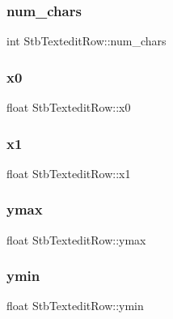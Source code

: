 \subsubsection{\texorpdfstring{num\+\_\+chars}{num\_chars}}
{\footnotesize\ttfamily int Stb\+Textedit\+Row\+::num\+\_\+chars}

\hypertarget{struct_stb_textedit_row_af30b3e1d61d1acea26d3e0ebec2cb81d}{}\label{struct_stb_textedit_row_af30b3e1d61d1acea26d3e0ebec2cb81d} 
\subsubsection{\texorpdfstring{x0}{x0}}
{\footnotesize\ttfamily float Stb\+Textedit\+Row\+::x0}

\hypertarget{struct_stb_textedit_row_a3a3e1a506030c871a1b3d09bf26e341f}{}\label{struct_stb_textedit_row_a3a3e1a506030c871a1b3d09bf26e341f} 
\subsubsection{\texorpdfstring{x1}{x1}}
{\footnotesize\ttfamily float Stb\+Textedit\+Row\+::x1}

\hypertarget{struct_stb_textedit_row_aab290e15f6a3b4a96ab2c2472cc8a7a5}{}\label{struct_stb_textedit_row_aab290e15f6a3b4a96ab2c2472cc8a7a5} 
\subsubsection{\texorpdfstring{ymax}{ymax}}
{\footnotesize\ttfamily float Stb\+Textedit\+Row\+::ymax}

\hypertarget{struct_stb_textedit_row_a707d331bd9dc99d64c81f71106b75eed}{}\label{struct_stb_textedit_row_a707d331bd9dc99d64c81f71106b75eed} 
\subsubsection{\texorpdfstring{ymin}{ymin}}
{\footnotesize\ttfamily float Stb\+Textedit\+Row\+::ymin}

